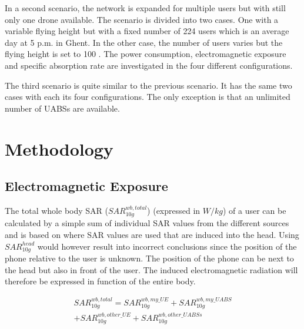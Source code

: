 \documentclass[twocolumn]{phdsymp} %
\begin{document}
In a second scenario, the network is expanded for multiple users but with still only one drone available. 
The scenario is divided into two cases. One with a variable flying height but with a fixed 
number of 224 users which is an average day 
at 5 p.m. in Ghent. In the other case, the number of users varies but the flying height is set to 100 \cite{J2}.
The power consumption, electromagnetic exposure and specific 
absorption rate are investigated in the four different configurations.

The third scenario is quite similar to the previous scenario. It has the same 
two cases with each its four configurations. The only exception is that an unlimited number of UABSs are available.

\section{Methodology}

\subsection{Electromagnetic Exposure}


The total whole body SAR ($SAR^{wb,total}_{10g}$) (expressed in $W/kg$) of a user can be calculated by a simple sum of individual SAR values from the different sources
and is based on \cite{J17_kuehn2019modelling} where SAR values are used that are induced into the head.
Using $SAR^{head}_{10g}$ would however result into incorrect conclusions since 
the position of the phone relative to the user is unknown. 
The position of the phone can be next to the head but also in front of the user.
The induced electromagnetic radiation will therefore be expressed in function of the entire body.


\begin{equation} 
\begin{aligned}
SAR^{wb,total}_{10g} = SAR^{wb,my\_UE}_{10g} +  SAR^{wb,my\_UABS}_{10g} \\
+ SAR^{wb,other\_UE}_{10g} + SAR^{wb,other\_UABSs}_{10g}
\end{aligned}
\label{eq:overallSARwb}
\end{equation}
\end{document}
